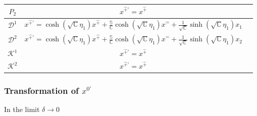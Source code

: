 \documentclass[]{article}
\numberwithin{equation}{section}
\begin{document}
{{\begin{table}[h!]
{\begin{tabular}{|c|c|c|}
              \hline
              \rule{0pt}{16pt} $P_{2}$ & $ x^{\hat{+}\prime}=x^{\hat{+}}$  \\
              \hline
               \rule{0pt}{16pt} $\mathcal{D}^{1}$ &  $ x^{\hat{+}\prime}=\cosh{(\sqrt{\mathbb{C}}\eta_{1})}x^{\hat{+}}+\frac{\mathbb{S}}{\mathbb{C}}\cosh{(\sqrt{\mathbb{C}}\eta_{1})}x^{\hat{-}}+\frac{1}{\sqrt{\mathbb{C}}}\sinh{(\sqrt{\mathbb{C}}\eta_{1})}x_{{1}}$ \\
               \hline
               \rule{0pt}{16pt} $\mathcal{D}^{2}$ & $ x^{\hat{+}\prime}=\cosh{(\sqrt{\mathbb{C}}\eta_{1})}x^{\hat{+}}+\frac{\mathbb{S}}{\mathbb{C}}\cosh{(\sqrt{\mathbb{C}}\eta_{1})}x^{\hat{-}}+\frac{1}{\sqrt{\mathbb{C}}}\sinh{(\sqrt{\mathbb{C}}\eta_{1})}x_{{2}}$ \\
               \hline
               \rule{0pt}{16pt} $\mathcal{K}^{1}$ & $ x^{\hat{+}\prime}=x^{\hat{+}}$ \\
               \hline
               \rule{0pt}{16pt} $\mathcal{K}^{2}$ & $ x^{\hat{+}\prime}=x^{\hat{+}}$ \\
               \hline
        \end{tabular}}
        \label{tab:my_label}
    \end{table}

\pagebreak
\subsubsection{Transformation of $x^{0\prime}$}
In the limit $\delta\longrightarrow0$

}}
\end{document}
